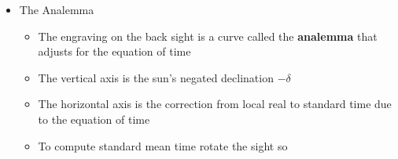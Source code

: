 \documentclass[final]{beamer}
\begin{document}
\begin{frame}
\begin{columns}[t]
\begin{column}[t]{0.24 \textwidth}
\begin{itemize}
\begin{itemize}
\begin{center}
\end{center}
\end{itemize}
\item The Analemma
\begin{itemize}
\item The engraving on the back sight is a curve 
called the {\bf analemma} that adjusts for the equation of time
\item The vertical axis is the sun's negated declination $-\delta$
\item The horizontal axis is the correction from local real
to standard time due to the equation of time
\begin{center}
\end{center}
\item To compute standard mean time rotate the sight so

\end{itemize}
\end{itemize}
\end{column}
\end{columns}
\end{frame}
\end{document}
